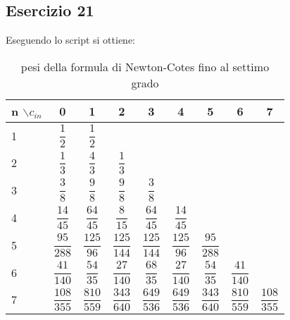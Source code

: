 \subsection{Esercizio 21}

Eseguendo lo script  si ottiene:
\begin{table}[h]
    \centering
    \renewcommand\arraystretch{3}
    \begin{tabular}{|l|c|c|c|c|c|c|c|c|}
        \hline
        n $\backslash c_{in}$ & 0 & 1 & 2 & 3 & 4 & 5 & 6 & 7 \\
        \hline
        1 & $\dfrac{1}{2}$ & $\dfrac{1}{2}$ & & & & &  &\\
        \hline
        2 & $\dfrac{1}{3}$ & $\dfrac{4}{3}$ & $\dfrac{1}{3}$ & & & &&\\
        \hline
        3 &  $\dfrac{3}{8}$ & $\dfrac{9}{8}$ & $\dfrac{9}{8}$ & $\dfrac{3}{8}$ & & & & \\
        \hline
        4 & $\dfrac{14}{45} $ & $\dfrac{64}{45} $ & $\dfrac{8}{15} $ & $\dfrac{64}{45} $ &$\dfrac{14}{45} $ &&&\\
        \hline
        5 & $\dfrac{95}{288}$ & $\dfrac{125}{96}$ & $\dfrac{125}{144}$ & $\dfrac{125}{144}$ & $\dfrac{125}{96}$ & $\dfrac{95}{288}$ &&\\
        \hline
        6 & $\dfrac{41}{140}$ & $\dfrac{54}{35}$ & $\dfrac{27}{140}$ & $\dfrac{68}{35}$ & $\dfrac{27}{140}$ & $\dfrac{54}{35}$ & $\dfrac{41}{140}$ &\\
        \hline
        7 & $\dfrac{108}{355}$ & $\dfrac{810}{559}$ & $\dfrac{343}{640}$ & $\dfrac{649}{536}$ & $\dfrac{649}{536}$  & $\dfrac{343}{640}$ & $\dfrac{810}{559}$ & $\dfrac{108}{355}$\\
        \hline
    \end{tabular}
    \caption{pesi della formula di Newton-Cotes fino al settimo grado}
\end{table}